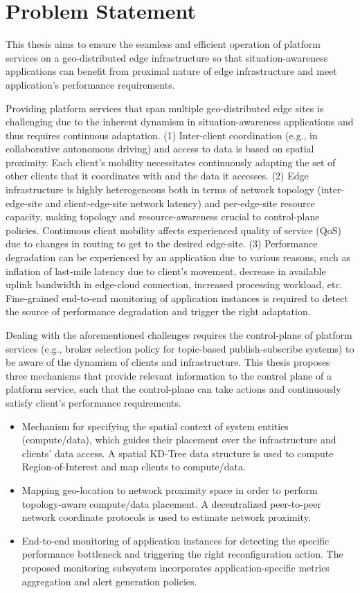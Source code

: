 \section{Problem Statement}
This thesis aims to ensure the seamless and efficient operation of platform services on a geo-distributed edge infrastructure so that situation-awareness applications can benefit from proximal nature of edge infrastructure and meet application's performance requirements. 
\par Providing platform services that span multiple geo-distributed edge sites is challenging due to the inherent dynamism in  situation-awareness applications and thus requires continuous adaptation. (1) Inter-client coordination (e.g., in collaborative autonomous driving) and access to data is based on spatial proximity. Each client's mobility necessitates continuously adapting the set of other clients that it coordinates with and the data it accesses. (2) Edge infrastructure is highly heterogeneous both in terms of network topology (inter-edge-site and client-edge-site network latency) and per-edge-site resource capacity, making topology and resource-awareness crucial to control-plane policies. Continuous client mobility affects experienced quality of service (QoS) due to changes in routing to get to the desired edge-site. (3) Performance degradation can be experienced by an application due to various reasons, such as inflation of last-mile latency due to client's movement, decrease in available uplink bandwidth in edge-cloud connection, increased processing workload, etc. Fine-grained end-to-end monitoring of application instances is required to detect the source of performance degradation and trigger the right adaptation.
\par Dealing with the aforementioned challenges requires the control-plane of platform services (e.g., broker selection policy for topic-based publish-subscribe systems) to be aware of the dynamism of clients and infrastructure. This thesis proposes three mechanisms that provide relevant information to the control plane of a platform service, such that the control-plane can take actions and continuously satisfy client's performance requirements.
\begin{itemize}
\item Mechanism for specifying the spatial context of system entities (compute/data), which guides their placement over the infrastructure and clients' data access. A spatial KD-Tree data structure is used to compute Region-of-Interest and map clients to compute/data. 
\item Mapping geo-location to network proximity space in order to perform topology-aware compute/data placement. A decentralized peer-to-peer network coordinate protocols is used to estimate network proximity.
\item End-to-end monitoring of application instances for detecting the specific performance bottleneck and triggering the right reconfiguration action. The proposed monitoring subsystem incorporates application-specific metrics aggregation and alert generation policies. 
\end{itemize}

